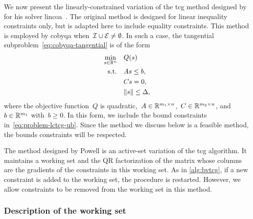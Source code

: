 We now present the linearly-constrained variation of the \gls{tcg} method designed by \citeauthor{Powell_2015} for his solver \gls{lincoa}~\cite{Powell_2015}.
The original method is designed for linear inequality constraints only, but is adapted here to include equality constraints.
This method is employed by \gls{cobyqa} when~$\mathcal{I} \cup \mathcal{E} \neq \emptyset$.
In such a case, the tangential subproblem~\cref{eq:cobyqa-tangential} is of the form
\begin{subequations}
    \label{eq:problem-lctcg}
    \begin{align}
        \min_{\sstep \in \R^n}  & \quad Q(\sstep)\\
        \text{s.t.}             & \quad A \sstep \le b, \label{eq:problem-lctcg-ub}\\
                                & \quad C \sstep = 0,\\
                                & \quad \norm{\sstep} \le \rad,
    \end{align}
\end{subequations}
where the objective function~$Q$ is quadratic,~$A \in \mathbb{R}^{m_1 \times n}$,~$C \in \mathbb{R}^{m_2 \times n}$, and~$b \in \mathbb{R}^{m_1}$ with~$b \ge 0$.
In this form, we include the bound constraints in~\cref{eq:problem-lctcg-ub}.
Since the method we discuss below is a feasible method, the bounds constraints will be respected.

The method designed by Powell is an active-set variation of the \gls{tcg} algorithm.
It maintains a working set and the QR factorization of the matrix whose columns are the gradients of the constraints in this working set.
As in \cref{alg:bvtcg}, if a new constraint is added to the working set, the procedure is restarted.
However, we allow constraints to be removed from the working set in this method.

\subsubsection{Description of the working set}

